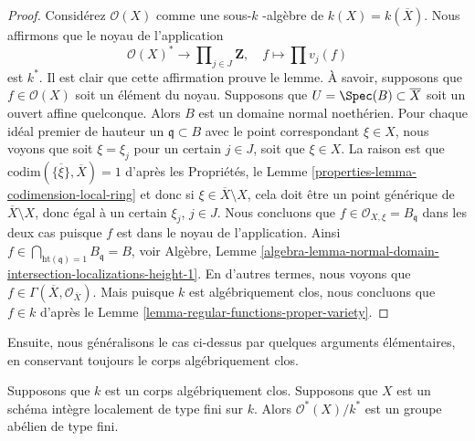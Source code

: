 \begin{proof}
\medskip\noindent
Considérez $\mathcal{O}(X)$ comme une sous-$k$ -algèbre de $k(X)
= k(\overline{X})$. Nous affirmons que le noyau de l'application
$$
\mathcal{O}(X)^* \longrightarrow
\prod\nolimits_{j \in J} \mathbf{Z},
\quad
f \longmapsto \prod v_j(f)
$$
est $k^*$. Il est clair que cette affirmation prouve le
lemme. À savoir, supposons que $f \in \mathcal{O}(X)$ soit
un élément du noyau. Supposons que $U = \Spec(B) \subset
\overline{X}$ soit un ouvert affine quelconque. Alors $B$
est un domaine normal noethérien. Pour chaque idéal
premier de hauteur un $\mathfrak q \subset B$ avec le
point correspondant $\xi \in X$, nous voyons que soit $\xi
= \xi_j$ pour un certain $j \in J$, soit que $\xi \in X$.
La raison est que $\text{codim}(\overline{\{\xi\}},
\overline{X}) = 1$ d'après les Propriétés, le Lemme
\ref{properties-lemma-codimension-local-ring} et donc si
$\xi \in \overline{X} \setminus X$, cela doit être un point
générique de $\overline{X} \setminus X$, donc égal à un
certain $\xi_j$, $j \in J$. Nous concluons que $f \in
\mathcal{O}_{X, \xi} = B_{\mathfrak q}$ dans les deux cas
puisque $f$ est dans le noyau de l'application. Ainsi $f \in
\bigcap_{\text{ht}(\mathfrak q) = 1} B_{\mathfrak q} = B$, voir
Algèbre, Lemme
\ref{algebra-lemma-normal-domain-intersection-localizations-height-1}. En
d'autres termes, nous voyons que $f \in \Gamma(\overline{X},
\mathcal{O}_{\overline{X}})$. Mais puisque $k$ est algébriquement clos, nous
concluons que $f \in k$ d'après le Lemme \ref{lemma-regular-functions-proper-variety}.
\end{proof}

\noindent
Ensuite, nous généralisons le cas ci-dessus par quelques arguments
élémentaires, en conservant toujours le corps algébriquement clos.

\begin{lemma}
\label{lemma-units-integral-finite-type-algebraically-closed}
Supposons que $k$ est un corps algébriquement clos. Supposons
que $X$ est un schéma intègre localement de type fini sur $k$.
Alors $\mathcal{O}^*(X)/k^*$ est un groupe abélien de type fini.
\end{lemma}

